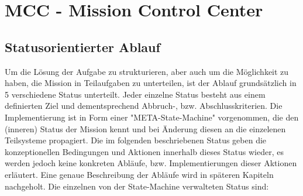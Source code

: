 \chapter{MCC - Mission Control Center}\label{MCC - Mission Control Center}

\section{Statusorientierter Ablauf}

Um die Lösung der Aufgabe zu strukturieren, aber auch um die Möglichkeit zu haben, die Mission in Teilaufgaben zu unterteilen, ist der Ablauf grundsätzlich in 5 verschiedene Status unterteilt. Jeder einzelne Status besteht aus einem definierten Ziel und dementsprechend Abbruch-, bzw. Abschlusskriterien. Die Implementierung ist in Form einer "META-State-Machine" vorgenommen, die den (inneren) Status der Mission kennt und bei Änderung diesen an die einzelenen Teilsysteme propagiert. Die im folgenden beschriebenen Status geben die konzeptionellen Bedingungen und Aktionen innerhalb dieses Status wieder, es werden jedoch keine konkreten Abläufe, bzw. Implementierungen dieser Aktionen erläutert. Eine genaue Beschreibung der Abläufe wird in späteren Kapiteln nachgeholt. Die einzelnen von der State-Machine verwalteten Status sind:

